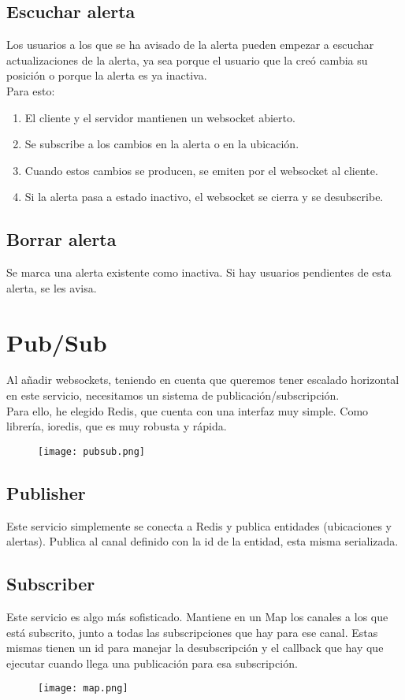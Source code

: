 \subsection{Escuchar alerta}\label{subsec:websocket}
Los usuarios a los que se ha avisado de la alerta pueden empezar a escuchar actualizaciones de la alerta,
ya sea porque el usuario que la creó cambia su posición o porque la alerta es ya inactiva. \\
Para esto:
\begin{enumerate}
	\item El cliente y el servidor mantienen un websocket abierto.
	\item Se subscribe a los cambios en la alerta o en la ubicación.
	\item Cuando estos cambios se producen, se emiten por el websocket al cliente.
	\item Si la alerta pasa a estado inactivo, el websocket se cierra y se desubscribe.
\end{enumerate}

\subsection{Borrar alerta}
Se marca una alerta existente como inactiva. Si hay usuarios pendientes de esta alerta, se les avisa.


\section{Pub/Sub}\label{sec:pubsub}
Al añadir websockets, teniendo en cuenta que queremos tener escalado horizontal en este servicio,
necesitamos un sistema de publicación/subscripción. \\
Para ello, he elegido Redis, que cuenta con una interfaz muy simple. Como librería, ioredis, 
que es muy robusta y rápida.


\begin{figure}[H]
	\centering	
	\texttt{[image: pubsub.png]}
	\end{figure}

\subsection{Publisher}

Este servicio simplemente se conecta a Redis y publica entidades (ubicaciones y alertas).
Publica al canal definido con la id de la entidad, esta misma serializada.

\subsection{Subscriber}
Este servicio es algo más sofisticado. Mantiene en un Map los canales a los que está subscrito, 
junto a todas las subscripciones que hay para ese canal. Estas mismas tienen un id para manejar la desubscripción y 
el callback que hay que ejecutar cuando llega una publicación para esa subscripción. 
\begin{figure}[H]
	\centering	
	\texttt{[image: map.png]}
	\end{figure}

